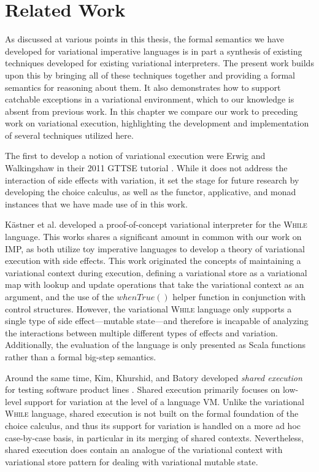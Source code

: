 \documentclass[12pt,oneside]{book}
\begin{document}
\chapter{Related Work}
\label{ch:rw}

As discussed at various points in this thesis, the formal semantics we have developed for variational imperative languages
is in part a synthesis of existing techniques developed for existing variational interpreters. The present work builds upon this
by bringing all of these techniques together and providing a formal semantics for reasoning about them. It also demonstrates
how to support catchable exceptions in a variational environment, which to our knowledge is absent from previous work.
In this chapter we compare our work to preceding work on variational execution, highlighting the development and implementation
of several techniques utilized here.

The first to develop a notion of variational execution were Erwig and Walkingshaw in their 2011 GTTSE tutorial \cite{EW11gttse}.
While it does not address the interaction of side effects with variation, it set the stage for future research by developing the choice calculus,
as well as the functor, applicative, and monad instances that we have made use of in this work.

 K\"astner et al. \cite{varwhile} developed a proof-of-concept variational interpreter for the \textsc{While} language. This works shares a
 significant amount in common with our work on IMP, as both utilize toy imperative languages to develop a theory of variational execution
 with side effects. This work originated the concepts of maintaining a variational context during execution, defining a variational store as
 a variational map with lookup and update operations that take the variational context as an argument, and the use of the $\mathit{whenTrue}()$
 helper function in conjunction with control structures. However, the variational \textsc{While} language only supports a single type of side
 effect---mutable state---and therefore is incapable of analyzing the interactions between multiple different types of effects and variation.
 Additionally, the evaluation of the language is only presented as Scala functions rather than a formal big-step semantics.
 
 Around the same time, Kim, Khurshid, and Batory developed \emph{shared execution} for testing software product lines \cite{sharedexec}.
 Shared execution primarily focuses on low-level support for variation at the level of a language VM.
 Unlike the variational \textsc{While} language, shared execution is not built on the formal foundation of the choice calculus, and thus its
 support for variation is handled on a more ad hoc case-by-case basis, in particular in its merging of shared contexts. Nevertheless,
 shared execution does contain an analogue of the variational context with variational store pattern for dealing with variational mutable state.
 
\end{document}
